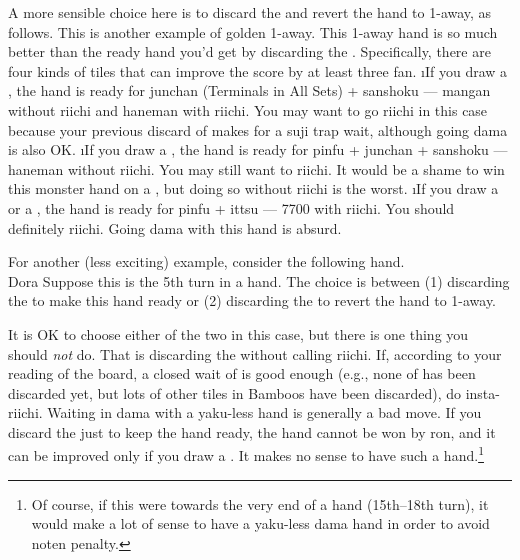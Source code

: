 \bigskip
A more sensible choice here is to discard the {\large {}} and revert the hand to 1-away, as follows. 
\bp
{}%
\ep
This is another example of golden 1-away. 
This 1-away hand is so much better than the ready hand you'd get by discarding the {\large {}}. Specifically, there are four kinds of tiles that can improve the score by at least three {\jap fan}. 
\bi {}
\i If you draw a {\large{}}, the hand is ready for {\jap junchan} (Terminals in All Sets) + {\jap sanshoku} --- {\jap mangan} without {\jap riichi} and {\jap haneman} with {\jap riichi}. You may want to go {\jap riichi} in this case because your previous discard of {\large {}} makes for a {\jap suji} trap wait, although going {\jap dama} is also OK. 
\i If you draw a {\large{}}, the hand is ready for {\jap pinfu + junchan + sanshoku} --- {\jap haneman} without {\jap riichi}. You may still want to {\jap riichi}. It would be a shame to win this monster hand on a {\large{}}, but doing so without {\jap riichi} is the worst. 
\i If you draw a {\large{}} or a {\large{}}, the hand is ready for {\jap pinfu + ittsu} --- 7700 with {\jap riichi}. You should definitely {\jap riichi}. Going {\jap dama} with this hand is absurd.
\ei

\bigskip

For another (less exciting) example, consider the following hand.
\bp
{}~~\bei\\
\hspace{315pt}\footnotesize{\jap Dora}
\ep
Suppose this is the 5th turn in a hand. The choice is between (1) discarding the {\large{}} to make this hand ready or (2) discarding the {\large{}} to revert the hand to 1-away. 

\bigskip
It is OK to choose either of the two in this case, but there is one thing you should \emph{not} do. That is discarding the {\large{}} without calling {\jap riichi}. 
If, according to your reading of the board, a closed wait of {\large{}} is good enough (e.g., none of {\large {}} has been discarded yet, but lots of other tiles in Bamboos have been discarded), do insta-{\jap riichi}. Waiting in {\jap dama} with a {\jap yaku}-less hand is generally a bad move. If you discard the {\large{}} just to keep the hand ready, the hand cannot be won by {\jap ron}, and it can be improved only if you draw a {\large{}}. It makes no sense to have such a hand.\footnote{Of course, if this were towards the very end of a hand (15th--18th turn), it would make a lot of sense to have a {\jap yaku}-less {\jap dama} hand in order to avoid {\jap noten} penalty.} 

